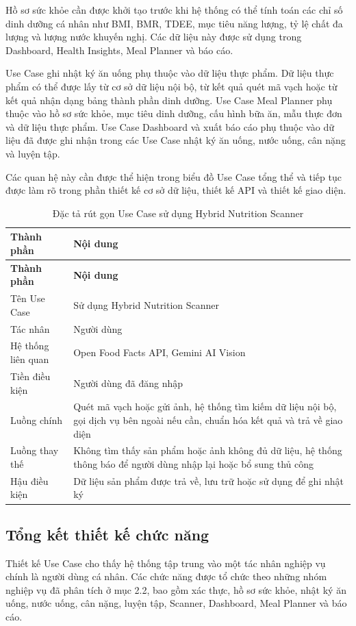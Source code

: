 \documentclass[12pt, a4paper]{report}
\begin{document}
Hồ sơ sức khỏe cần được khởi tạo trước khi hệ thống có thể tính toán các chỉ số dinh dưỡng cá nhân như BMI, BMR, TDEE, mục tiêu năng lượng, tỷ lệ chất đa lượng và lượng nước khuyến nghị. Các dữ liệu này được sử dụng trong Dashboard, Health Insights, Meal Planner và báo cáo.

Use Case ghi nhật ký ăn uống phụ thuộc vào dữ liệu thực phẩm. Dữ liệu thực phẩm có thể được lấy từ cơ sở dữ liệu nội bộ, từ kết quả quét mã vạch hoặc từ kết quả nhận dạng bảng thành phần dinh dưỡng. Use Case Meal Planner phụ thuộc vào hồ sơ sức khỏe, mục tiêu dinh dưỡng, cấu hình bữa ăn, mẫu thực đơn và dữ liệu thực phẩm. Use Case Dashboard và xuất báo cáo phụ thuộc vào dữ liệu đã được ghi nhận trong các Use Case nhật ký ăn uống, nước uống, cân nặng và luyện tập.

Các quan hệ này cần được thể hiện trong biểu đồ Use Case tổng thể và tiếp tục được làm rõ trong phần thiết kế cơ sở dữ liệu, thiết kế API và thiết kế giao diện.

\begin{longtable}{|>{\raggedright\arraybackslash}p{5cm}|p{10cm}|}
\caption{Đặc tả rút gọn Use Case sử dụng Hybrid Nutrition Scanner}
\label{tab:uc_scanner} \\
\hline
\textbf{Thành phần} & \textbf{Nội dung} \\
\hline
\endfirsthead
\hline
\textbf{Thành phần} & \textbf{Nội dung} \\
\hline
\endhead

Tên Use Case & Sử dụng Hybrid Nutrition Scanner \\
\hline
Tác nhân & Người dùng \\
\hline
Hệ thống liên quan & Open Food Facts API, Gemini AI Vision \\
\hline
Tiền điều kiện & Người dùng đã đăng nhập \\
\hline
Luồng chính & Quét mã vạch hoặc gửi ảnh, hệ thống tìm kiếm dữ liệu nội bộ, gọi dịch vụ bên ngoài nếu cần, chuẩn hóa kết quả và trả về giao diện \\
\hline
Luồng thay thế & Không tìm thấy sản phẩm hoặc ảnh không đủ dữ liệu, hệ thống thông báo để người dùng nhập lại hoặc bổ sung thủ công \\
\hline
Hậu điều kiện & Dữ liệu sản phẩm được trả về, lưu trữ hoặc sử dụng để ghi nhật ký \\
\hline
\end{longtable}

\subsection{Tổng kết thiết kế chức năng}Thiết kế Use Case cho thấy hệ thống tập trung vào một tác nhân nghiệp vụ chính là người dùng cá nhân. Các chức năng được tổ chức theo những nhóm nghiệp vụ đã phân tích ở mục 2.2, bao gồm xác thực, hồ sơ sức khỏe, nhật ký ăn uống, nước uống, cân nặng, luyện tập, Scanner, Dashboard, Meal Planner và báo cáo.
\end{document}
